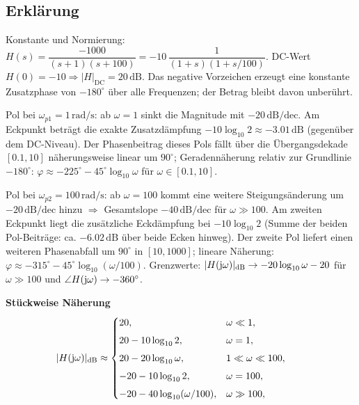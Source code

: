 \subsection{Erklärung}
\vspace{5mm}
\begin{description}[leftmargin=1.2em,labelsep=.6em,font=\bfseries]
\item[Schritt 1] Konstante und Normierung: 
\(H(s)=\dfrac{-1000}{(s+1)(s+100)}=-10\,\dfrac{1}{(1+s)(1+s/100)}\).
DC-Wert \(H(0)=-10\Rightarrow |H|_{\mathrm{DC}}=20\,\mathrm{dB}\). Das negative Vorzeichen erzeugt eine konstante Zusatzphase von \(-180^\circ\) über alle Frequenzen; der Betrag bleibt davon unberührt.
\item[Schritt 2] Pol bei \(\omega_{p1}=1\,\mathrm{rad/s}\): ab \(\omega=1\) sinkt die Magnitude mit \(-20\,\mathrm{dB/dec}\). Am Eckpunkt beträgt die exakte Zusatzdämpfung \(-10\log_{10}2\approx-3.01\,\mathrm{dB}\) (gegenüber dem DC-Niveau). Der Phasenbeitrag dieses Pols fällt über die Übergangsdekade \([0.1,10]\) näherungsweise linear um \(90^\circ\); Geradennäherung relativ zur Grundlinie \(-180^\circ\): \(\varphi\approx -225^\circ-45^\circ\log_{10}\omega\) für \(\omega\in[0.1,10]\).
\item[Schritt 3] Pol bei \(\omega_{p2}=100\,\mathrm{rad/s}\): ab \(\omega=100\) kommt eine weitere Steigungsänderung um \(-20\,\mathrm{dB/dec}\) hinzu \(\Rightarrow\) Gesamtslope \(-40\,\mathrm{dB/dec}\) für \(\omega\gg100\). Am zweiten Eckpunkt liegt die zusätzliche Eckdämpfung bei \(-10\log_{10}2\) (Summe der beiden Pol-Beiträge: ca. \(-6.02\,\mathrm{dB}\) über beide Ecken hinweg). Der zweite Pol liefert einen weiteren Phasenabfall um \(90^\circ\) in \([10,1000]\); lineare Näherung: \(\varphi\approx -315^\circ-45^\circ\log_{10}(\omega/100)\). Grenzwerte: \(|H(\operatorname{j}\!\omega)|_{\mathrm{dB}}\to -20\log_{10}\omega -20\) für \(\omega\gg100\) und \(\angle H(\operatorname{j}\!\omega)\to -360^\circ\).
\end{description}

\vspace{0.5cm}
\medskip
\noindent\textbf{Stückweise Näherung}
\[
|H(\operatorname{j}\!\omega)|_{\mathrm{dB}}\approx
\begin{cases}
20,& \omega\ll1,\\[4pt]
20-10\log_{10}2,& \omega=1,\\[4pt]
20-20\log_{10}\omega,& 1\ll\omega\ll100,\\[4pt]
-20-10\log_{10}2,& \omega=100,\\[4pt]
-20-40\log_{10}(\omega/100),& \omega\gg100,
\end{cases}
\qquad
\]
\newpage